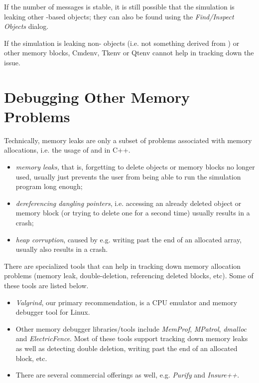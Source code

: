 If the number of messages is stable, it is still possible that the simulation
is leaking other -based objects; they can also be found
using the \textit{Find/Inspect Objects} dialog. 

If the simulation is leaking non-{\opp} objects (i.e. not something derived
from ) or other memory blocks, Cmdenv, Tkenv or Qtenv cannot
help in tracking down the issue.


\section{Debugging Other Memory Problems}
\label{sec:run-sim:memory-leaks-and-crashes}

Technically, memory leaks are only a subset of problems associated with memory
allocations, i.e. the usage of  and  in C++. 

\begin{itemize}
   \item \textit{memory leaks,} that is, forgetting to delete objects
     or memory blocks no longer used, usually just prevents the user from
     being able to run the simulation program long enough;
   \item \textit{dereferencing dangling pointers}, i.e. accessing
    an already deleted object or memory block (or trying to delete one
    for a second time) usually results in a crash;
   \item \textit{heap corruption}, caused by e.g. writing past the end of
   an allocated array, usually also results in a crash.
\end{itemize}


There are specialized tools that can help in tracking down memory allocation
problems (memory leak, double-deletion, referencing deleted blocks, etc). Some
of these tools are listed below.

\begin{itemize}
  \item \textit{Valgrind}, our primary recommendation, is a CPU emulator and
        memory debugger tool for Linux.
  \item Other memory debugger libraries/tools include \textit{MemProf},
        \textit{MPatrol}, \textit{dmalloc} and \textit{ElectricFence}.
        Most of these tools support tracking down memory leaks as well as
        detecting double deletion, writing past the end of an allocated block,
        etc.
  \item There are several commercial offerings as well, e.g. \textit{Purify}
        and \textit{Insure++}.
\end{itemize}


